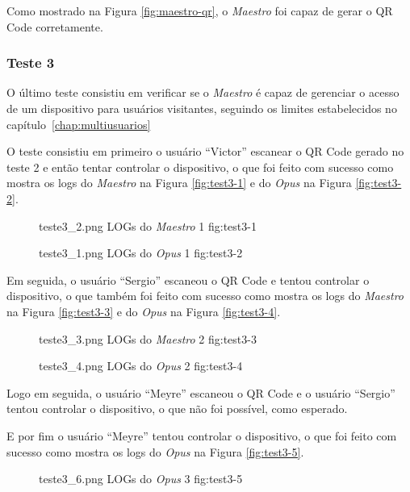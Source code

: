 Como mostrado na Figura \ref{fig:maestro-qr}, o \emph{Maestro} foi capaz de gerar o QR Code corretamente.

\subsubsection{Teste 3}

O último teste consistiu em verificar se o \emph{Maestro} é capaz de gerenciar o acesso de um dispositivo para usuários visitantes, seguindo os limites
estabelecidos no capítulo~\ref{chap:multiusuarios} 

O teste consistiu em primeiro o usuário ``Victor'' escanear o QR Code gerado no teste 2 e então tentar controlar o dispositivo, o que foi feito com sucesso
como mostra os logs do \emph{Maestro} na Figura \ref{fig:test3-1} e do \emph{Opus} na Figura \ref{fig:test3-2}.

\begin{figure}[h!]
    {teste3_2.png}
    {LOGs do \emph{Maestro} 1}
    {fig:test3-1}
\end{figure}

\begin{figure}[h!]
    {teste3_1.png}
    {LOGs do \emph{Opus} 1}
    {fig:test3-2}
\end{figure}

Em seguida, o usuário ``Sergio'' escaneou o QR Code e tentou controlar o dispositivo, o que também foi feito com sucesso como mostra os
logs do \emph{Maestro} na Figura \ref{fig:test3-3} e do \emph{Opus} na Figura \ref{fig:test3-4}.

\begin{figure}[h!]
    {teste3_3.png}
    {LOGs do \emph{Maestro} 2}
    {fig:test3-3}
\end{figure}

\begin{figure}[h!]
    {teste3_4.png}
    {LOGs do \emph{Opus} 2}
    {fig:test3-4}
\end{figure}

Logo em seguida, o usuário ``Meyre'' escaneou o QR Code e o usuário ``Sergio'' tentou controlar o dispositivo, o que não foi possível, como esperado.

E por fim o usuário ``Meyre'' tentou controlar o dispositivo, o que foi feito com sucesso como mostra os logs do \emph{Opus} na Figura \ref{fig:test3-5}.

\begin{figure}[h!]
    {teste3_6.png}
    {LOGs do \emph{Opus} 3}
    {fig:test3-5}
\end{figure}